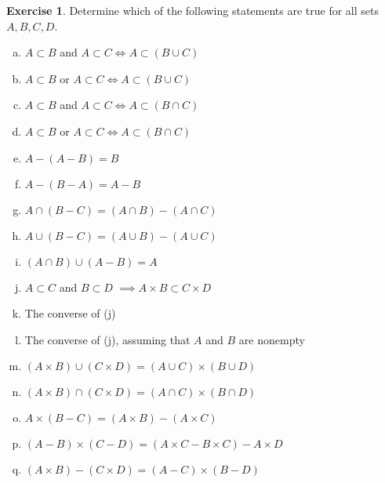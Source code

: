 \documentclass[11pt,a4paper,twoside]{article}
\theoremstyle{definition}
\newcounter{excounter}
\newtheorem{exercise}[excounter]{Exercise}
\begin{document}
\begin{exercise}
Determine which of the following statements are true for all sets $A, B, C, D$.
\begin{enumerate}[(a)]
\item $A \subset B$ and $A \subset C \iff A \subset (B \cup C)$
\item $A \subset B$ or $A \subset C \iff A \subset (B \cup C)$
\item $A \subset B$ and $A \subset C \iff A \subset (B \cap C)$
\item $A \subset B$ or $A \subset C \iff A \subset (B \cap C)$
\item $A - (A - B) = B$
\item $A - (B - A) = A - B$
\item $A \cap (B - C) = (A \cap B) - (A \cap C)$
\item $A \cup (B - C) = (A \cup B) - (A \cup C)$
\item $(A \cap B) \cup (A - B) = A$
\item $A \subset C$ and $B \subset D$ $\implies A \times B \subset C \times D$
\item The converse of (j)
\item The converse of (j), assuming that $A$ and $B$ are nonempty
\item $(A \times B) \cup (C \times D) = (A \cup C) \times (B \cup D)$
\item $(A \times B) \cap (C \times D) = (A \cap C) \times (B \cap D)$
\item $A \times (B - C) = (A \times B) - (A \times C)$
\item $(A - B) \times (C - D) = (A \times C - B \times C) - A \times D$
\item $(A \times B) - (C \times D) = (A - C) \times (B - D)$
\end{enumerate}
\end{exercise}
\end{document}
